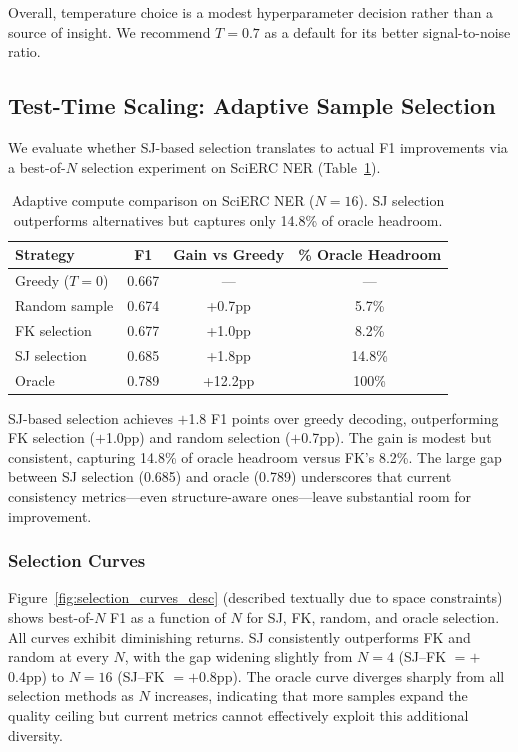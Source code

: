 \documentclass[11pt]{article}
\begin{document}
Overall, temperature choice is a modest hyperparameter decision rather than a source of insight.
We recommend $T{=}0.7$ as a default for its better signal-to-noise ratio.

\subsection{Test-Time Scaling: Adaptive Sample Selection}
\label{sec:adaptive}

We evaluate whether SJ-based selection translates to actual F1 improvements via a best-of-$N$ selection experiment on SciERC NER (Table~\ref{tab:adaptive}).

\begin{table}[t]
\centering
\caption{Adaptive compute comparison on SciERC NER ($N{=}16$). SJ selection outperforms alternatives but captures only 14.8\% of oracle headroom.}
\label{tab:adaptive}
\begin{tabular}{lccc}
\toprule
\textbf{Strategy} & \textbf{F1} & \textbf{Gain vs Greedy} & \textbf{\% Oracle Headroom} \\
\midrule
Greedy ($T{=}0$) & 0.667 & --- & --- \\
Random sample    & 0.674 & +0.7pp & 5.7\% \\
FK selection     & 0.677 & +1.0pp & 8.2\% \\
SJ selection     & 0.685 & +1.8pp & 14.8\% \\
Oracle           & 0.789 & +12.2pp & 100\% \\
\bottomrule
\end{tabular}
\end{table}

SJ-based selection achieves $+$1.8 F1 points over greedy decoding, outperforming FK selection ($+$1.0pp) and random selection ($+$0.7pp).
The gain is modest but consistent, capturing 14.8\% of oracle headroom versus FK's 8.2\%.
The large gap between SJ selection (0.685) and oracle (0.789) underscores that current consistency metrics---even structure-aware ones---leave substantial room for improvement.

\subsubsection{Selection Curves}

Figure~\ref{fig:selection_curves_desc} (described textually due to space constraints) shows best-of-$N$ F1 as a function of $N$ for SJ, FK, random, and oracle selection.
All curves exhibit diminishing returns.
SJ consistently outperforms FK and random at every $N$, with the gap widening slightly from $N{=}4$ (SJ--FK $= +$0.4pp) to $N{=}16$ (SJ--FK $= +$0.8pp).
The oracle curve diverges sharply from all selection methods as $N$ increases, indicating that more samples expand the quality ceiling but current metrics cannot effectively exploit this additional diversity.
\end{document}
